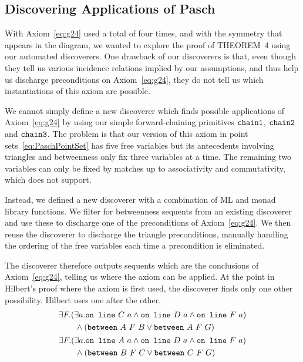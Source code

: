\subsection{Discovering Applications of Pasch}\label{sec:PaschDiscoverer}
With Axiom~\ref{eq:g24} used a total of four times, and with the symmetry that appears in the diagram, we wanted to explore the proof of THEOREM~4 using our automated discoverers. One drawback of our discoverers is that, even though they tell us various incidence relations implied by our assumptions, and thus help us discharge preconditions on Axiom~\ref{eq:g24}, they do not tell us which instantiations of this axiom are possible.

We cannot simply define a new discoverer which finds possible applications of Axiom~\ref{eq:g24} by using our simple forward-chaining primitives $\texttt{chain1}$, $\texttt{chain2}$ and $\texttt{chain3}$. The problem is that our version of this axiom in point sets~\eqref{eq:PaschPointSet} has five free variables but its antecedents involving triangles and betweenness only fix three variables at a time. The remaining two variables can only be fixed by matches up to associativity and commutativity, which  does not support.

Instead, we defined a new discoverer  with a combination of ML and monad library functions. We filter for betweenness sequents from an existing discoverer and use these to discharge one of the preconditions of Axiom~\ref{eq:g24}. We then reuse the discoverer  to discharge the triangle preconditions, manually handling the ordering of the free variables each time a precondition is eliminated. 

The  discoverer therefore outputs sequents which are the conclusions of Axiom~\ref{eq:g24}, telling us where the axiom can be applied. At the point in Hilbert's proof where the axiom is first used, the discoverer finds only one other possibility. Hilbert uses one after the other.
\begin{gather*}
\begin{split}
&\exists F. (\exists a. \code{on\ line}\ C\ a \wedge \code{on\ line}\ D\ a \wedge \code{on\ line}\ F\ a)\\
&\qquad \wedge (\between{A}{F}{B} \vee \between{A}{F}{G})
\end{split}\\
\begin{split}
&\exists F. (\exists a. \code{on\ line}\ A\ a \wedge \code{on\ line}\ D\ a \wedge \code{on\ line}\ F\ a)\\
&\qquad \wedge (\between{B}{F}{C} \vee \between{C}{F}{G})
\end{split}
\end{gather*}

